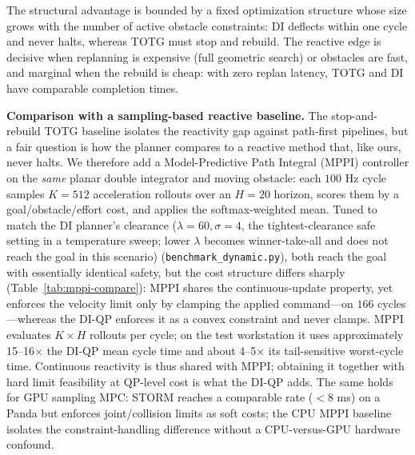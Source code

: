 The structural advantage is bounded by a fixed optimization structure
whose size grows with the number of active obstacle constraints: DI
deflects within one cycle and never halts, whereas TOTG must stop and
rebuild. The reactive edge is decisive when replanning is expensive
(full geometric search) or obstacles are fast, and marginal when the
rebuild is cheap: with zero replan latency, TOTG and DI have comparable
completion times.

\textbf{Comparison with a sampling-based reactive baseline.} The
stop-and-rebuild TOTG baseline isolates the reactivity gap against
path-first pipelines, but a fair question is how the planner compares to
a reactive method that, like ours, never halts. We therefore add a
Model-Predictive Path Integral (MPPI) \cite{williams2017} controller on
the \emph{same} planar double integrator and moving obstacle: each
\(100\) Hz cycle samples \(K=512\) acceleration rollouts over an
\(H=20\) horizon, scores them by a goal/obstacle/effort cost, and applies
the softmax-weighted mean. Tuned to match the DI planner's clearance (\(\lambda=60,\sigma=4\), the
tightest-clearance safe setting in a temperature sweep; lower \(\lambda\)
becomes winner-take-all and does not reach the goal in this scenario)
(\texttt{benchmark\_dynamic.py}), both
reach the goal with essentially identical safety, but the cost structure
differs sharply (Table~\ref{tab:mppi-compare}): MPPI shares the
continuous-update property, yet enforces the velocity limit
only by clamping the applied command---on \(166\) cycles---whereas the
DI-QP enforces it as a convex constraint and never clamps. MPPI evaluates
\(K\!\times\!H\) rollouts per cycle; on the test workstation it uses
approximately 15--16\(\times\) the DI-QP mean cycle time and about
4--5\(\times\) its tail-sensitive worst-cycle time. Continuous reactivity is thus shared
with MPPI; obtaining it together with hard limit feasibility at QP-level
cost is what the DI-QP adds. The same holds
for GPU sampling MPC: STORM \cite{storm2022} reaches a comparable rate
($<\!8$ ms) on a Panda but enforces joint/collision limits as soft costs;
the CPU MPPI baseline isolates the constraint-handling difference without
a CPU-versus-GPU hardware confound.

